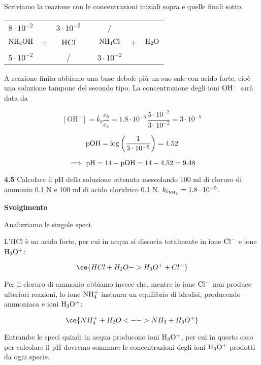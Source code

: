 Scriviamo la reazione con le concentrazioni iniziali sopra e quelle finali sotto:

\begin{center}
    \begin{tabular}{ccccccc}
        $8 \cdot 10^{-2}$ &  & $3 \cdot 10^{-2}$ & & / &&\\
        $\rm NH_4OH$ & + & HCl & \ce{->} & $\rm NH_4Cl$ & + & $\rm H_2O$\\
        $5 \cdot 10^{-2}$ &  &  / & & $3 \cdot 10^{-2}$&&\\
    \end{tabular}
\end{center}

A reazione finita abbiamo una base debole più un suo sale con acido forte, cioè una soluzione tampone del secondo tipo. La concentrazione degli ioni $\rm OH^-$ sarà data da

$$[\text{OH}^-]=k_b\frac{c_b}{c_s}
=1.8 \cdot 10^{-5}\,\frac{5 \cdot 10^{-2}}{3 \cdot 10^{-2}}= 3 \cdot 10^{-5}$$

$$\rm pOH=\log\left(\frac{1}{3 \cdot 10^{-5}}\right)=4.52$$

$$\implies \rm pH=14-pOH=14-4.52=9.48$$



\vspace{0.2cm}\textbf{4.5} Calcolare il pH della soluzione ottenuta mescolando 100 ml di cloruro di ammonio 0.1 N e 100
ml di acido cloridrico 0.1 N. $k_{b_{\rm NH_3}}=1.8 \cdot 10^{-5}$.

\vspace{0.2cm}\large\textbf{Svolgimento}\normalsize

\vspace{0.2cm}Analizziamo le singole speci.

L'HCl è un acido forte, per cui in acqua si dissocia totalmente in ione $\rm Cl^-$ e ione $\rm H_3O^+$:

$$\ce{HCl + H_2O -> H_3O^+ + Cl^-}$$

Per il cloruro di ammonio abbiamo invece che, mentre lo ione $\rm Cl^-$ non produce ulteriori reazioni, lo ione $\rm NH_4^+$ instaura un equilibrio di idrolisi, producendo ammoniaca e ioni $\rm H_3O^+$:

$$\ce{NH_4^+ + H_2O <--> NH_3 + H_3O^+}$$

Entrambe le speci quindi in acqua producono ioni $\rm H_3O^+$, per cui in questo caso per calcolare il pH dovremo sommare le concentrazioni degli ioni $\rm H_3O^+$ prodotti da ogni specie.

